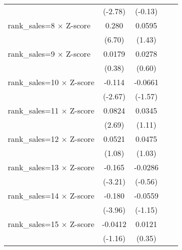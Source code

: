 {\begin{tabular}{l*{4}{c}}
                    &     (-2.78)         &     (-0.13)         &                     &                     \\
rank\_sales=8 $\times$ Z-score&       0.280\sym{***}&      0.0595         &                     &                     \\
                    &      (6.70)         &      (1.43)         &                     &                     \\
rank\_sales=9 $\times$ Z-score&      0.0179         &      0.0278         &                     &                     \\
                    &      (0.38)         &      (0.60)         &                     &                     \\
rank\_sales=10 $\times$ Z-score&      -0.114\sym{**} &     -0.0661         &                     &                     \\
                    &     (-2.67)         &     (-1.57)         &                     &                     \\
rank\_sales=11 $\times$ Z-score&      0.0824\sym{**} &      0.0345         &                     &                     \\
                    &      (2.69)         &      (1.11)         &                     &                     \\
rank\_sales=12 $\times$ Z-score&      0.0521         &      0.0475         &                     &                     \\
                    &      (1.08)         &      (1.03)         &                     &                     \\
rank\_sales=13 $\times$ Z-score&      -0.165\sym{**} &     -0.0286         &                     &                     \\
                    &     (-3.21)         &     (-0.56)         &                     &                     \\
rank\_sales=14 $\times$ Z-score&      -0.180\sym{***}&     -0.0559         &                     &                     \\
                    &     (-3.96)         &     (-1.15)         &                     &                     \\
rank\_sales=15 $\times$ Z-score&     -0.0412         &      0.0121         &                     &                     \\
                    &     (-1.16)         &      (0.35)         &                     &                     \\

\end{tabular}}
